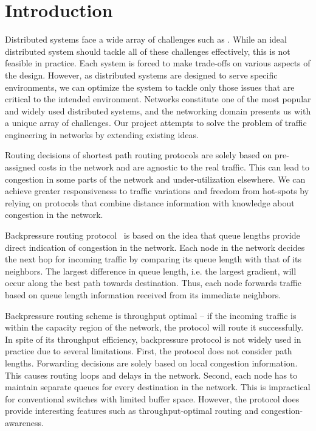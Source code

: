 \label{sec:prob}


\section{Introduction}

Distributed systems face a wide array of challenges such as .  While an ideal distributed system should tackle all of these challenges effectively, this is not feasible in practice. Each system is forced to make trade-offs on various aspects of the design. However, as distributed systems are designed to serve specific environments, we can optimize the system to tackle only those issues that are critical to the intended environment. Networks constitute one of the most popular and widely used distributed systems, and the networking domain presents us with a unique array of challenges. Our project attempts to solve the problem of traffic engineering in networks by extending existing ideas.

Routing decisions of shortest path routing protocols are solely based on pre-assigned costs in the network and are agnostic to the real traffic. This can lead to congestion in some parts of the network and under-utilization elsewhere. We can achieve greater responsiveness to traffic variations and freedom from hot-spots by relying on protocols that combine distance information with knowledge about congestion in the network. 

Backpressure routing protocol~\cite{BP-orig} is based on the idea that queue lengths provide direct indication of congestion in the network. Each node in the network decides the next hop for incoming traffic by comparing its queue length with that of its neighbors. The largest difference in queue length, i.e. the largest gradient, will occur along the best path towards destination. Thus, each node forwards traffic based on queue length information received from its immediate neighbors. 

Backpressure routing scheme is throughput optimal -- if the incoming traffic is within the capacity region of the network, the protocol will route it successfully. In spite of its throughput efficiency, backpressure protocol is not widely used in practice due to several limitations. First, the protocol does not consider path lengths. Forwarding decisions are solely based on local congestion information. This causes routing loops and delays in the network. Second, each node has to maintain separate queues for every destination in the network. This is impractical for conventional switches with limited buffer space. However, the protocol does provide interesting features such as throughput-optimal routing and congestion-awareness. 

